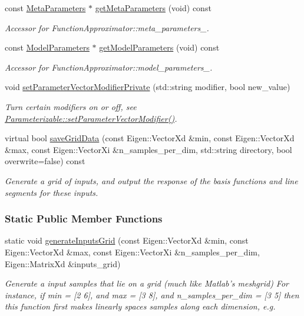 \begin{DoxyCompactItemize}
const \hyperlink{classDmpBbo_1_1MetaParameters}{Meta\+Parameters} $\ast$ \hyperlink{classDmpBbo_1_1FunctionApproximator_a6f1a44062eac61d88b647c358bcda155}{get\+Meta\+Parameters} (void) const 
\begin{DoxyCompactList}\small\item\em Accessor for Function\+Approximator\+::meta\+\_\+parameters\+\_\+. \end{DoxyCompactList}\item 
const \hyperlink{classDmpBbo_1_1ModelParameters}{Model\+Parameters} $\ast$ \hyperlink{classDmpBbo_1_1FunctionApproximator_a0e7e116ed9b159d782fca544dacb4bac}{get\+Model\+Parameters} (void) const 
\begin{DoxyCompactList}\small\item\em Accessor for Function\+Approximator\+::model\+\_\+parameters\+\_\+. \end{DoxyCompactList}\item 
void \hyperlink{classDmpBbo_1_1FunctionApproximator_add0186ca30d91928b887805fe0d24598}{set\+Parameter\+Vector\+Modifier\+Private} (std\+::string modifier, bool new\+\_\+value)
\begin{DoxyCompactList}\small\item\em Turn certain modifiers on or off, see \hyperlink{classDmpBbo_1_1Parameterizable_a6eefba9dfdcfe8878c10150074c6a68e}{Parameterizable\+::set\+Parameter\+Vector\+Modifier()}. \end{DoxyCompactList}\item 
virtual bool \hyperlink{classDmpBbo_1_1FunctionApproximator_a53d95f63de3b49491b1204f45a24ae25}{save\+Grid\+Data} (const Eigen\+::\+Vector\+Xd \&min, const Eigen\+::\+Vector\+Xd \&max, const Eigen\+::\+Vector\+Xi \&n\+\_\+samples\+\_\+per\+\_\+dim, std\+::string directory, bool overwrite=false) const 
\begin{DoxyCompactList}\small\item\em Generate a grid of inputs, and output the response of the basis functions and line segments for these inputs. \end{DoxyCompactList}\end{DoxyCompactItemize}
\subsubsection*{Static Public Member Functions}
\begin{DoxyCompactItemize}
\item 
static void \hyperlink{classDmpBbo_1_1FunctionApproximator_a61da4383ffab7d919c98d628c1d217d1}{generate\+Inputs\+Grid} (const Eigen\+::\+Vector\+Xd \&min, const Eigen\+::\+Vector\+Xd \&max, const Eigen\+::\+Vector\+Xi \&n\+\_\+samples\+\_\+per\+\_\+dim, Eigen\+::\+Matrix\+Xd \&inputs\+\_\+grid)
\begin{DoxyCompactList}\small\item\em Generate a input samples that lie on a grid (much like Matlab's meshgrid) For instance, if min = \mbox{[}2 6\mbox{]}, and max = \mbox{[}3 8\mbox{]}, and n\+\_\+samples\+\_\+per\+\_\+dim = \mbox{[}3 5\mbox{]} then this function first makes linearly spaces samples along each dimension, e.\+g. \end{DoxyCompactList}\end{DoxyCompactItemize}
